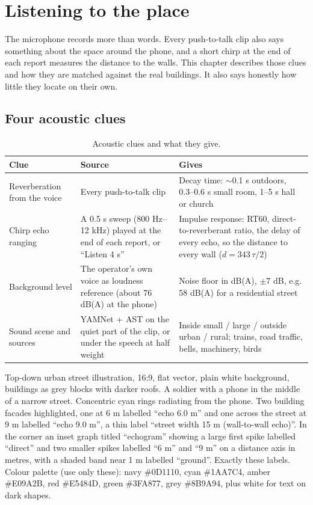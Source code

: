\chapter{Listening to the place}\label{ch:acoustics}

The microphone records more than words. Every push-to-talk clip also says something about the space around
the phone, and a short chirp at the end of each report measures the distance to the walls. This chapter
describes those clues and how they are matched against the real buildings. It also says honestly how little
they locate on their own.

\section{Four acoustic clues}

\begin{table}[htbp]\centering\small
\caption{Acoustic clues and what they give.}\label{tab:aclues}
\begin{tabularx}{\linewidth}{>{\raggedright}p{3.2cm}>{\raggedright}p{4.6cm}X}
\toprule
Clue & Source & Gives\\
\midrule
Reverberation from the voice & Every push-to-talk clip & Decay time: $\sim$0.1 s outdoors, 0.3--0.6 s small room, 1--5 s hall or church\\
Chirp echo ranging & A 0.5 s sweep (800 Hz--12 kHz) played at the end of each report, or ``Listen 4 s'' & Impulse response: RT60, direct-to-reverberant ratio, the delay of every echo, so the distance to every wall ($d = 343\,\tau/2$)\\
Background level & The operator's own voice as loudness reference (about 76 dB(A) at the phone) & Noise floor in dB(A), $\pm$7 dB, e.g. 58 dB(A) for a residential street\\
Sound scene and sources & YAMNet + AST on the quiet part of the clip, or under the speech at half weight & Inside small / large / outside urban / rural; trains, road traffic, bells, machinery, birds\\
\bottomrule
\end{tabularx}
\end{table}

{Top-down urban street illustration, 16:9, flat vector, plain white background, buildings as grey blocks with darker roofs.
A soldier with a phone in the middle of a narrow street. Concentric cyan rings radiating from the phone. Two building
facades highlighted, one at 6 m labelled ``echo 6.0 m'' and one across the street at 9 m labelled ``echo 9.0 m'', a
thin label ``street width 15 m (wall-to-wall echo)''. In the corner an inset graph titled ``echogram'' showing a large
first spike labelled ``direct'' and two smaller spikes labelled ``6 m'' and ``9 m'' on a distance axis in metres, with a
shaded band near 1 m labelled ``ground''. Exactly these labels. Colour palette (use only these): navy \#0D1110, cyan \#1AA7C4, amber \#E09A2B, red \#E5484D, green \#3FA877, grey \#8B9A94, plus white for text on dark shapes.}

